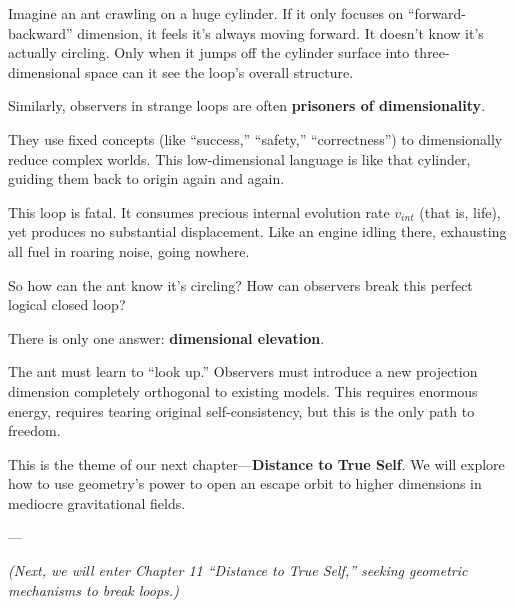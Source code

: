 Imagine an ant crawling on a huge cylinder. If it only focuses on ``forward-backward'' dimension, it feels it's always moving forward. It doesn't know it's actually circling. Only when it jumps off the cylinder surface into three-dimensional space can it see the loop's overall structure.

Similarly, observers in strange loops are often \textbf{prisoners of dimensionality}.

They use fixed concepts (like ``success,'' ``safety,'' ``correctness'') to dimensionally reduce complex worlds. This low-dimensional language is like that cylinder, guiding them back to origin again and again.

This loop is fatal. It consumes precious internal evolution rate $v_{int}$ (that is, life), yet produces no substantial displacement. Like an engine idling there, exhausting all fuel in roaring noise, going nowhere.

So how can the ant know it's circling? How can observers break this perfect logical closed loop?

There is only one answer: \textbf{dimensional elevation}.

The ant must learn to ``look up.'' Observers must introduce a new projection dimension completely orthogonal to existing models. This requires enormous energy, requires tearing original self-consistency, but this is the only path to freedom.

This is the theme of our next chapter---\textbf{Distance to True Self}. We will explore how to use geometry's power to open an escape orbit to higher dimensions in mediocre gravitational fields.

---

\textit{(Next, we will enter Chapter 11 ``Distance to True Self,'' seeking geometric mechanisms to break loops.)}

